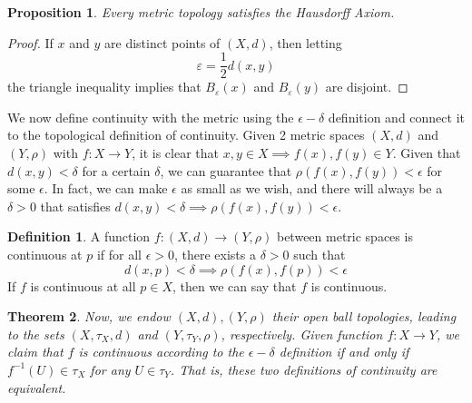 \documentclass{article}
\newtheorem{theorem}{Theorem}[section]
\newtheorem{proposition}[theorem]{Proposition}
\theoremstyle{remark}
\theoremstyle{definition}
\newtheorem{definition}{Definition}[section]
\begin{document}
\begin{proposition}
Every metric topology satisfies the Hausdorff Axiom.
\end{proposition}
\begin{proof}
If $x$ and $y$ are distinct points of $(X, d)$, then letting
\[\varepsilon = \frac{1}{2} d(x, y)\]
the triangle inequality implies that $B_\varepsilon (x)$ and $B_\varepsilon (y)$ are disjoint. 
\end{proof}

We now define continuity with the metric using the $\epsilon - \delta$ definition and connect it to the topological definition of continuity. Given 2 metric spaces $(X, d)$ and $(Y, \rho)$ with $f: X \longrightarrow Y$, it is clear that $x, y \in X \implies f(x), f(y) \in Y$. Given that $d(x, y) < \delta$ for a certain $\delta$, we can guarantee that $\rho(f(x), f(y)) < \epsilon$ for some $\epsilon$. In fact, we can make $\epsilon$ as small as we wish, and there will always be a $\delta > 0$ that satisfies $d(x, y) < \delta \implies \rho(f(x), f(y)) < \epsilon$.  

\begin{definition}
A function $f: (X, d) \longrightarrow (Y, \rho)$ between metric spaces is continuous at $p$ if for all $\epsilon > 0$, there exists a $\delta > 0$ such that 
\[ d(x, p) < \delta \implies \rho ( f(x), f(p)) < \epsilon\]
If $f$ is continuous at all $p \in X$, then we can say that $f$ is continuous.
\end{definition}

\begin{theorem}
Now, we endow $(X, d), (Y, \rho)$ their open ball topologies, leading to the sets $(X, \tau_X, d)$ and $(Y, \tau_Y, \rho)$, respectively. Given function $f: X \longrightarrow Y$, we claim that $f$ is continuous according to the $\epsilon - \delta$ definition if and only if $f^{-1}(U) \in \tau_{X}$ for any $U \in \tau_Y$. That is, these two definitions of continuity are equivalent. 
\end{theorem}
\end{document}
